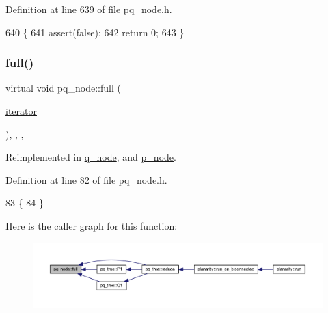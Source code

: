Definition at line 639 of file pq\+\_\+node.\+h.


\begin{DoxyCode}
640     \{
641     assert(\textcolor{keyword}{false});
642     \textcolor{keywordflow}{return} 0;
643     \}
\end{DoxyCode}
\mbox{\label{classpq__node_af1ba861293e4493dba7cc2c9332fee76}} 
\subsubsection{\texorpdfstring{full()}{full()}}
{\footnotesize\ttfamily virtual void pq\+\_\+node\+::full (\begin{DoxyParamCaption}\item[{\mbox{\hyperlink{classpq__node_a34898c9eb1527787c07e8ebefd6bfba5}{iterator}}}]{ }\end{DoxyParamCaption})\hspace{0.3cm}{\ttfamily [inline]}, {\ttfamily [protected]}, {\ttfamily [virtual]}, {\ttfamily [inherited]}}



Reimplemented in \mbox{\hyperlink{classq__node_a525633c6276761fa795a9b54688cc036}{q\+\_\+node}}, and \mbox{\hyperlink{classp__node_a0ba10aa3a56e26676d78af2e05fb5cd1}{p\+\_\+node}}.



Definition at line 82 of file pq\+\_\+node.\+h.


\begin{DoxyCode}
83     \{
84     \}
\end{DoxyCode}
Here is the caller graph for this function\+:
\nopagebreak
\begin{figure}[H]
\begin{center}
\leavevmode
\includegraphics[width=350pt]{classpq__node_af1ba861293e4493dba7cc2c9332fee76_icgraph}
\end{center}
\end{figure}
\mbox{\label{classpq__leaf_a31c4b7512aae53901bb20308fe3a8834}} 
